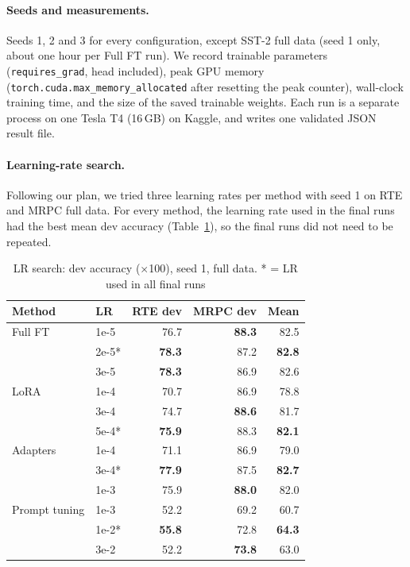 \documentclass{nle}
\begin{document}
\paragraph{Seeds and measurements.} Seeds 1, 2 and 3 for every configuration, except SST-2 full data (seed 1 only, about one hour per Full FT run). We record trainable parameters (\texttt{requires\_grad}, head included), peak GPU memory (\texttt{torch.cuda.max\_memory\_allocated} after resetting the peak counter), wall-clock training time, and the size of the saved trainable weights. Each run is a separate process on one Tesla T4 (16\,GB) on Kaggle, and writes one validated JSON result file.

\paragraph{Learning-rate search.} Following our plan, we tried three learning rates per method with seed 1 on RTE and MRPC full data. For every method, the learning rate used in the final runs had the best mean dev accuracy (Table~\ref{tab:lr}), so the final runs did not need to be repeated.

\begin{table}
  \caption{LR search: dev accuracy ($\times$100), seed 1, full data. * = LR used in all final runs}
  \label{tab:lr}
  \begin{minipage}{\textwidth}
    \begin{tabular}{llrrr}
    \hline\hline
    Method & LR & RTE dev & MRPC dev & Mean \\
    \hline
    Full FT & 1e-5 & 76.7 & {\bf 88.3} & 82.5 \\
     & 2e-5* & {\bf 78.3} & 87.2 & {\bf 82.8} \\
     & 3e-5 & {\bf 78.3} & 86.9 & 82.6 \\
    \hline
    LoRA & 1e-4 & 70.7 & 86.9 & 78.8 \\
     & 3e-4 & 74.7 & {\bf 88.6} & 81.7 \\
     & 5e-4* & {\bf 75.9} & 88.3 & {\bf 82.1} \\
    \hline
    Adapters & 1e-4 & 71.1 & 86.9 & 79.0 \\
     & 3e-4* & {\bf 77.9} & 87.5 & {\bf 82.7} \\
     & 1e-3 & 75.9 & {\bf 88.0} & 82.0 \\
    \hline
    Prompt tuning & 1e-3 & 52.2 & 69.2 & 60.7 \\
     & 1e-2* & {\bf 55.8} & 72.8 & {\bf 64.3} \\
     & 3e-2 & 52.2 & {\bf 73.8} & 63.0 \\
    \hline\hline
    \end{tabular}
  \end{minipage}
\end{table}
\end{document}
